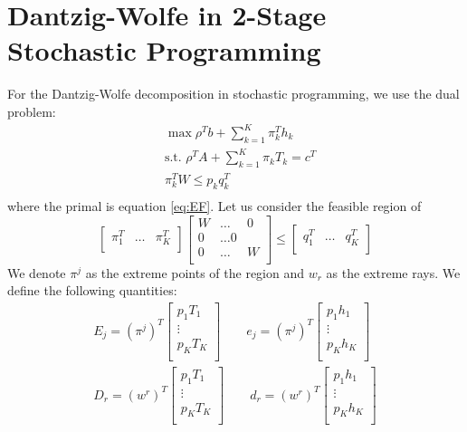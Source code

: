 \documentclass[12pt, openany]{report}
\theoremstyle{definition}
\begin{document}
\section{Dantzig-Wolfe in 2-Stage Stochastic Programming}
For the Dantzig-Wolfe decomposition in stochastic programming, we use the dual problem:
\begin{equation}
	\begin{aligned}
		&\max \rho^Tb + \sum_{k=1}^K\pi_k^Th_k\\
		&\text{s.t. } \rho^T A + \sum_{k=1}^K \pi_kT_k = c^T\\
		& \pi_k^T W\le p_k q_k^T\\
	\end{aligned}
\end{equation}
where the primal is equation \ref{eq:EF}. 
Let us consider the feasible region of 
\begin{equation}
	\begin{bmatrix}
		\pi_1^T & \dots & \pi_K^T\\
	\end{bmatrix}
	\begin{bmatrix}
		W& \dots & 0\\
		0 & \dots 0\\
		0 & \dots & W\\
	\end{bmatrix}
	\le \begin{bmatrix}
		q_1^T & \dots & q_K^T\\
	\end{bmatrix}
\end{equation}
We denote $\pi^j$ as the extreme points of the region and $w_r$ as the extreme rays. We define the following quantities:
\begin{equation}
	\begin{aligned}
		E_j = (\pi^j)^T\begin{bmatrix}
			p_1 T_1\\ \vdots\\ p_K T_K\\
		\end{bmatrix} \qquad e_j = (\pi^j)^T \begin{bmatrix}
			p_1h_1\\ \vdots\\ p_Kh_K\\
		\end{bmatrix}\\
		D_r = (w^r)^T \begin{bmatrix}
			p_1 T_1\\ \vdots\\ p_K T_K\\
		\end{bmatrix}
		\qquad d_r = (w^r)^T \begin{bmatrix}
			p_1h_1\\ \vdots\\ p_Kh_K\\
		\end{bmatrix}
	\end{aligned}
\end{equation}
\end{document}
